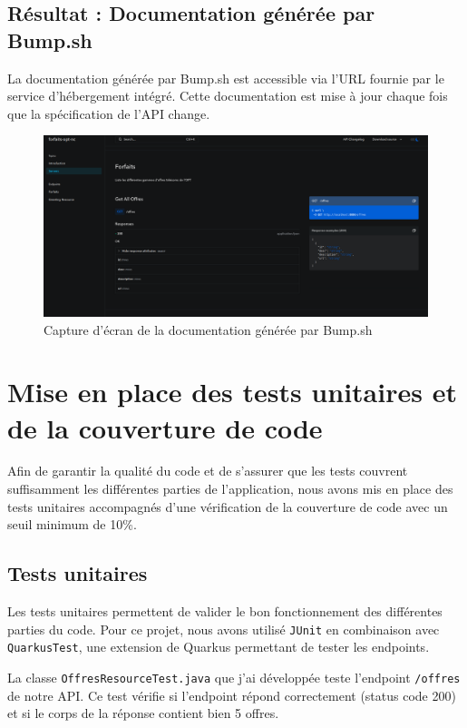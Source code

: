 \documentclass{article}
\begin{document}
	\subsection{Résultat : Documentation générée par Bump.sh}
	
	La documentation générée par Bump.sh est accessible via l'URL fournie par le service d'hébergement intégré. Cette documentation est mise à jour chaque fois que la spécification de l'API change.
	
	\begin{figure}[h!]
		\centering
		\includegraphics[width=\textwidth]{asset/bump-sh-documentation.png}
		\caption{Capture d'écran de la documentation générée par Bump.sh}
	\end{figure}

	
	
	\section{Mise en place des tests unitaires et de la couverture de code}
	\label{subsec:test-offres}
	
	Afin de garantir la qualité du code et de s'assurer que les tests couvrent suffisamment les différentes parties de l'application, nous avons mis en place des tests unitaires accompagnés d'une vérification de la couverture de code avec un seuil minimum de 10\%.
	
	\subsection{Tests unitaires}
	Les tests unitaires permettent de valider le bon fonctionnement des différentes parties du code. Pour ce projet, nous avons utilisé \texttt{JUnit} en combinaison avec \texttt{QuarkusTest}, une extension de Quarkus permettant de tester les endpoints. 
	
	La classe \texttt{OffresResourceTest.java} que j'ai développée teste l'endpoint \texttt{/offres} de notre API. Ce test vérifie si l'endpoint répond correctement (status code 200) et si le corps de la réponse contient bien 5 offres.
	
\end{document}
